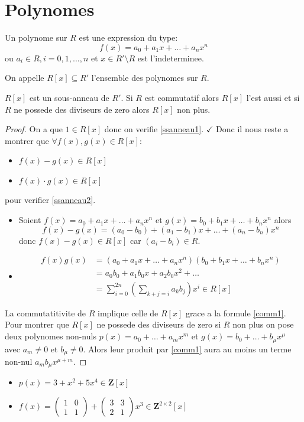 \section{Polynomes}
\begin{definition}[Polynome]
Un polynome sur $R$ est une expression du type:
$$
f(x)=a_{0}+a_{1}x+\dots+a_{n}x^{n}
$$
ou $a_{i}\in R,i=0,1,\dots,n$ et $x \in R'\setminus R$ est l'indeterminee.

On appelle $R[x]\subseteq R'$ l'ensemble des polynomes sur $R$.
\end{definition}
\begin{theorem}
$R[x]$ est un sous-anneau de $R'$. Si $R$ est commutatif alors $R[x]$ l'est aussi et si $R$ ne possede des diviseurs de zero alors $R[x]$ non plus.
\end{theorem}
\begin{proof}
On a que $1\in R[x]$ donc on verifie \ref{ssanneau1}. $\checkmark$ Donc il nous reste a montrer que $\forall f(x),g(x)\in R[x]$: 
\begin{itemize}
\item $f(x)-g(x)\in R[x]$
\item $f(x)\cdot g(x)\in R[x]$
\end{itemize}
pour verifier \ref{ssanneau2}.
\begin{itemize}
\item Soient $f(x)=a_{0}+a_{1}x+\dots+a_{n}x^{n}$ et $g(x)=b_{0}+b_{1}x+\dots+b_{n}x^{n}$ alors
$$
f(x)-g(x)=(a_{0}-b_{0})+(a_{1}-b_{1})x+\dots+(a_{n}-b_{n})x^{n}
$$
donc $f(x)-g(x)\in R[x]$ car $(a_{i}-b_{i})\in R$.
\item

\begin{align}
f(x)g(x) & =(a_{0}+a_{1}x+\dots +a_{n}x^{n})(b_{0}+b_{1}x+\dots+b_{n}x^{n}) \\
 & =a_{0}b_{0}+a_{1}b_{0}x +a_{2}b_{0}x^{2}+\dots \\
 & =\sum_{i=0}^{2n} \left( \sum_{k+j=i} a_{k}b_{j}\right)x^{i} \in R[x] \label{comm1}
\end{align}
\end{itemize}
La commutatitivite de $R$ implique celle de $R[x]$ grace a la formule \ref{comm1}. Pour montrer que $R[x]$ ne possede des diviseurs de zero si $R$ non plus on pose deux polynomes non-nuls $p(x)=a_{0}+\dots+a_{m}x^{m}$ et $g(x)=b_{0}+\dots+b_{\mu}x^{\mu}$ avec $a_{m}\neq0$ et $b_{\mu}\neq0$. Alors leur produit par \ref{comm1} aura au moins un terme non-nul $a_{m}b_{\mu}x^{\mu+m}$.
\end{proof}
\begin{example}
\begin{itemize}
\item $p(x)=3+x^{2}+5x^{4}\in \mathbf{Z}[x]$
\item $f(x)=\begin{pmatrix} 1 & 0 \\  1 & 1\end{pmatrix}+\begin{pmatrix}3 & 3 \\ 2 & 1\end{pmatrix}x^{3}\in \mathbf{Z}^{2\times2}[x]$
\end{itemize}
\end{example}

